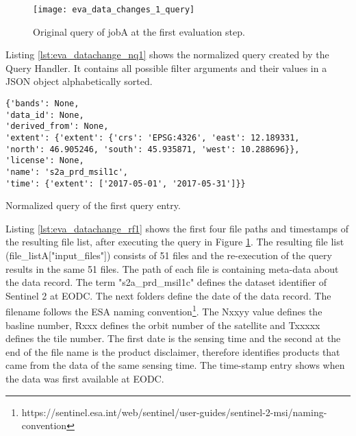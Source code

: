 \documentclass[draft,final]{vutinfth} %
\newenvironment{code}{\captionsetup{type=listing}}{}
\begin{document}
\begin{enumerate}
	\begin{figure}[h]
		\centering
		\texttt{[image: eva\_data\_changes\_1\_query]}
		\caption{Original query of jobA at the first evaluation step.}
		\label{fig:eva_data_changes_1_query} %
	\end{figure}
	
	Listing \ref{lst:eva_datachange_nq1} shows the normalized query created by the Query Handler. It contains all possible filter arguments and their values in a JSON object alphabetically sorted.
	
	\begin{code}
		\begin{verbatim}
{'bands': None, 
'data_id': None, 
'derived_from': None, 
'extent': {'extent': {'crs': 'EPSG:4326', 'east': 12.189331, 
'north': 46.905246, 'south': 45.935871, 'west': 10.288696}}, 
'license': None, 
'name': 's2a_prd_msil1c', 
'time': {'extent': ['2017-05-01', '2017-05-31']}}
		\end{verbatim}
		\caption{Normalized query of the first query entry.}
		\label{lst:eva_datachange_nq1}
	\end{code}
	
	Listing \ref{lst:eva_datachange_rf1} shows the first four file paths and timestamps of the resulting file list, after executing the query in Figure \ref{fig:eva_data_changes_1_query}. The resulting file list (file\_listA["input\_files"]) consists of 51 files and the re-execution of the query results in the same 51 files. The path of each file is containing meta-data about the data record. The term "s2a\_prd\_msil1c" defines the dataset identifier of Sentinel 2 at EODC. The next folders define the date of the data record. The filename follows the ESA naming convention\footnote{https://sentinel.esa.int/web/sentinel/user-guides/sentinel-2-msi/naming-convention}. The Nxxyy value defines the basline number, Rxxx defines the orbit number of the satellite and Txxxxx defines the tile number. The first date is the sensing time and the second at the end of the file name is the product disclaimer, therefore identifies products that came from the data of the same sensing time. The time-stamp entry shows when the data was first available at EODC.
	

\end{enumerate}
\end{document}
